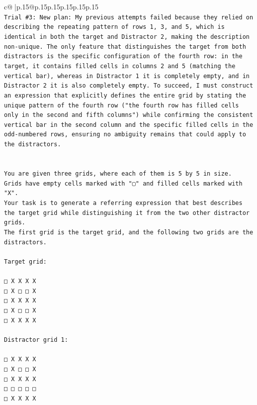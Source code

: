 \documentclass{article}
\begin{document}
{\begin{supertabular}{c@{$\;$}|p{.15\linewidth}@{}p{.15\linewidth}p{.15\linewidth}p{.15\linewidth}p{.15\linewidth}p{.15\linewidth}}
{{{\\ 
\texttt{Trial \#3: New plan: My previous attempts failed because they relied on describing the repeating pattern of rows 1, 3, and 5, which is identical in both the target and Distractor 2, making the description non{-}unique. The only feature that distinguishes the target from both distractors is the specific configuration of the fourth row: in the target, it contains filled cells in columns 2 and 5 (matching the vertical bar), whereas in Distractor 1 it is completely empty, and in Distractor 2 it is also completely empty. To succeed, I must construct an expression that explicitly defines the entire grid by stating the unique pattern of the fourth row ("the fourth row has filled cells only in the second and fifth columns") while confirming the consistent vertical bar in the second column and the specific filled cells in the odd{-}numbered rows, ensuring no ambiguity remains that could apply to the distractors.} \\
\\ 
\\ 
\texttt{You are given three grids, where each of them is 5 by 5 in size.} \\
\texttt{Grids have empty cells marked with "▢" and filled cells marked with "X".} \\
\texttt{Your task is to generate a referring expression that best describes the target grid while distinguishing it from the two other distractor grids.} \\
\texttt{The first grid is the target grid, and the following two grids are the distractors.} \\
\\ 
\texttt{Target grid:} \\
\\ 
\texttt{□ X X X X} \\
\texttt{□ X □ □ X} \\
\texttt{□ X X X X} \\
\texttt{□ X □ □ X} \\
\texttt{□ X X X X} \\
\\ 
\texttt{Distractor grid 1:} \\
\\ 
\texttt{□ X X X X} \\
\texttt{□ X □ □ X} \\
\texttt{□ X X X X} \\
\texttt{□ □ □ □ □} \\
\texttt{□ X X X X} \\
}}}
\end{supertabular}}
\end{document}
